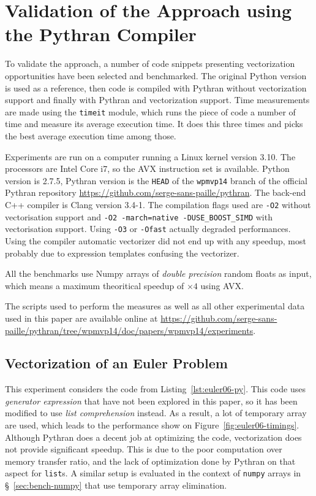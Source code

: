 \documentclass[10pt]{sigplanconf}
\begin{document}
\section{Validation of the Approach using the Pythran Compiler}
\label{sec:benchs}

To validate the approach, a number of code snippets presenting vectorization
opportunities have been selected and benchmarked. The original Python version
is used as a reference, then code is compiled with Pythran without
vectorization support and finally with Pythran and vectorization support. Time
measurements are made using the \texttt{timeit} module, which runs the piece of
code a number of time and measure its average execution time. It does this
three times and picks the best average execution time among those.

Experiments are run on a computer running a Linux kernel version 3.10. The
processors are Intel Core i7, so the AVX instruction set is available. Python
version is 2.7.5, Pythran version is the \texttt{HEAD} of the \texttt{wpmvp14}
branch of the official Pythran repository
\url{https://github.com/serge-sans-paille/pythran}. The back-end C++ compiler
is Clang version 3.4-1. The compilation flags used are \texttt{-O2} without
vectorisation support and \texttt{-O2 -march=native -DUSE\_BOOST\_SIMD} with
vectorisation support. Using \texttt{-O3} or \texttt{-Ofast} actually degraded
performances. Using the compiler automatic vectorizer did not end up with any
speedup, most probably due to expression templates confusing the vectorizer.

All the benchmarks use Numpy arrays of \emph{double precision} random floats as
input, which means a maximum theoritical speedup of $\times4$ using AVX. 

The scripts used to perform the measures as well as all other experimental data
used in this paper are available online at
\url{https://github.com/serge-sans-paille/pythran/tree/wpmvp14/doc/papers/wpmvp14/experiments}.



\subsection{Vectorization of an Euler Problem}

This experiment considers the code from Listing~\ref{lst:euler06-py}. This code
uses \emph{generator expression} that have not been explored in this paper, so
it has been modified to use \emph{list comprehension} instead. As a result, a
lot of temporary array are used, which leads to the performance show on
Figure~\ref{fig:euler06-timings}. Although Pythran does a decent job at
optimizing the code, vectorization does not provide significant speedup. This
is due to the poor computation over memory transfer ratio, and the lack of
optimization done by Pythran on that aspect for \texttt{list}s. A similar setup
is evaluated in the context of \texttt{numpy} arrays in
\S~\ref{sec:bench-numpy} that use temporary array elimination.
\end{document}
